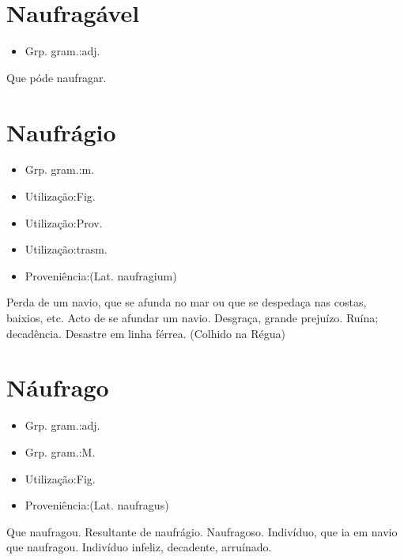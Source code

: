 \section{Naufragável}
\begin{itemize}
\item {Grp. gram.:adj.}
\end{itemize}
Que póde naufragar.
\section{Naufrágio}
\begin{itemize}
\item {Grp. gram.:m.}
\end{itemize}
\begin{itemize}
\item {Utilização:Fig.}
\end{itemize}
\begin{itemize}
\item {Utilização:Prov.}
\end{itemize}
\begin{itemize}
\item {Utilização:trasm.}
\end{itemize}
\begin{itemize}
\item {Proveniência:(Lat. \textunderscore naufragium\textunderscore )}
\end{itemize}
Perda de um navio, que se afunda no mar ou que se despedaça nas costas, baixios, etc.
Acto de se afundar um navio.
Desgraça, grande prejuízo.
Ruína; decadência.
Desastre em linha férrea. (Colhido na Régua)
\section{Náufrago}
\begin{itemize}
\item {Grp. gram.:adj.}
\end{itemize}
\begin{itemize}
\item {Grp. gram.:M.}
\end{itemize}
\begin{itemize}
\item {Utilização:Fig.}
\end{itemize}
\begin{itemize}
\item {Proveniência:(Lat. \textunderscore naufragus\textunderscore )}
\end{itemize}
Que naufragou.
Resultante de naufrágio.
Naufragoso.
Indivíduo, que ia em navio que naufragou.
Indivíduo infeliz, decadente, arruínado.
